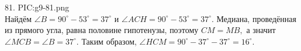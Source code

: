 81. {{PIC:g9-81.png}}\\
Найдём $\angle B=90^\circ-53^\circ=37^\circ$ и $\angle ACH=90^\circ-53^\circ=37^\circ.$ Медиана, проведённая из прямого угла, равна половине гипотенузы, поэтому $CM=MB,$ а значит $\angle MCB=\angle B=37^\circ.$ Таким образом, $\angle HCM=90^\circ-37^\circ-37^\circ=16^\circ.$\\
